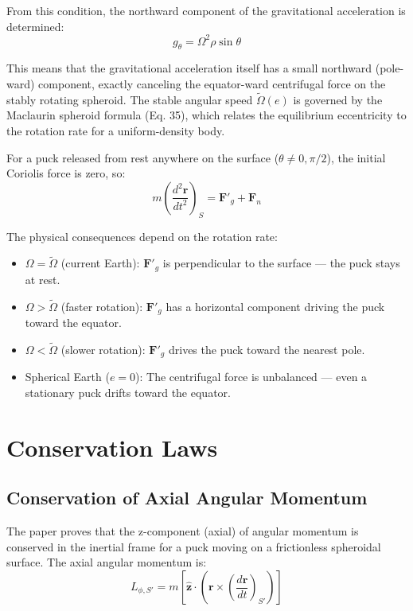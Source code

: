 \documentclass[10pt, a4paper]{article}
\begin{document}
From this condition, the northward component of the gravitational acceleration is determined: 
\begin{equation}
g_\theta = \Omega^2\rho\sin\theta \label{eq:38}
\end{equation}

This means that the gravitational acceleration itself has a small northward (pole-ward) component, exactly canceling the equator-ward centrifugal force on the stably rotating spheroid. The stable angular speed $\tilde{\Omega}(e)$ is governed by the Maclaurin spheroid formula (Eq. 35), which relates the equilibrium eccentricity to the rotation rate for a uniform-density body.

For a puck released from rest anywhere on the surface ($\theta \neq 0, \pi/2$), the initial Coriolis force is zero, so:
\begin{equation}
m\left(\frac{d^2\mathbf{r}}{dt^2}\right)_S = \mathbf{F}'_g + \mathbf{F}_n \label{eq:41}
\end{equation}

The physical consequences depend on the rotation rate: 
\begin{itemize}
    \item $\Omega = \tilde{\Omega}$ (current Earth): $\mathbf{F}'_g$ is perpendicular to the surface — the puck stays at rest. 
    \item $\Omega > \tilde{\Omega}$ (faster rotation): $\mathbf{F}'_g$ has a horizontal component driving the puck toward the equator. 
    \item $\Omega < \tilde{\Omega}$ (slower rotation): $\mathbf{F}'_g$ drives the puck toward the nearest pole. 
    \item Spherical Earth ($e = 0$): The centrifugal force is unbalanced — even a stationary puck drifts toward the equator.
\end{itemize}

\section{Conservation Laws}
\subsection{Conservation of Axial Angular Momentum}
The paper proves that the z-component (axial) of angular momentum is conserved in the inertial frame for a puck moving on a frictionless spheroidal surface. The axial angular momentum is:
\begin{equation}
L_{\phi, S'} = m[\hat{\mathbf{z}} \cdot (\mathbf{r} \times \left(\frac{d\mathbf{r}}{dt}\right)_{S'})] \label{eq:43}
\end{equation}
\end{document}
